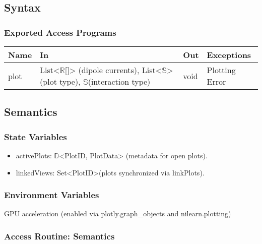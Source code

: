 \documentclass[12pt, titlepage]{article}
\begin{document}
\subsection{Syntax}


\subsubsection{Exported Access Programs}

\begin{center}
\begin{tabular}{p{2cm} p{4cm} p{4cm} p{2cm}}
\hline
\textbf{Name} & \textbf{In} & \textbf{Out} & \textbf{Exceptions} \\
\hline
plot & List<$\mathbb{R}$[]> (dipole currents), List<$\mathbb{S}$>(plot type), $\mathbb{S}$(interaction type) & void & Plotting Error \\

\hline
\end{tabular}
\end{center}

\subsection{Semantics}

\subsubsection{State Variables}

\begin{itemize}
\item activePlots: $\mathbb{D}$<PlotID, PlotData> (metadata for open plots).


\item linkedViews: Set<PlotID>(plots synchronized via linkPlots).


\end{itemize}


\subsubsection{Environment Variables}

GPU acceleration (enabled via plotly.graph\_objects and nilearn.plotting)



\subsubsection{Access Routine: Semantics}
\end{document}
